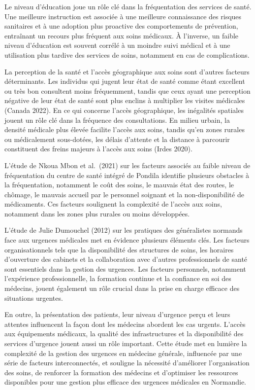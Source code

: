 \documentclass[
]{article}
\begin{document}
Le niveau d'éducation joue un rôle clé dans la fréquentation des
services de santé. Une meilleure instruction est associée à une
meilleure connaissance des risques sanitaires et à une adoption plus
proactive des comportements de prévention, entraînant un recours plus
fréquent aux soins médicaux. À l'inverse, un faible niveau d'éducation
est souvent corrélé à un moindre suivi médical et à une utilisation plus
tardive des services de soins, notamment en cas de complications.

La perception de la santé et l'accès géographique aux soins sont
d'autres facteurs déterminants. Les individus qui jugent leur état de
santé comme étant excellent ou très bon consultent moins fréquemment,
tandis que ceux ayant une perception négative de leur état de santé sont
plus enclins à multiplier les visites médicales (Canada 2022). En ce qui
concerne l'accès géographique, les inégalités spatiales jouent un rôle
clé dans la fréquence des consultations. En milieu urbain, la densité
médicale plus élevée facilite l'accès aux soins, tandis qu'en zones
rurales ou médicalement sous-dotées, les délais d'attente et la distance
à parcourir constituent des freins majeurs à l'accès aux soins (Irdes
2020).

L'étude de Nkoua Mbon et al.~(2021) sur les facteurs associés au faible
niveau de fréquentation du centre de santé intégré de Pondila identifie
plusieurs obstacles à la fréquentation, notamment le coût des soins, le
mauvais état des routes, le chômage, le mauvais accueil par le personnel
soignant et la non-disponibilité de médicaments. Ces facteurs soulignent
la complexité de l'accès aux soins, notamment dans les zones plus
rurales ou moins développées.

L'étude de Julie Dumouchel (2012) sur les pratiques des généralistes
normands face aux urgences médicales met en évidence plusieurs éléments
clés. Les facteurs organisationnels tels que la disponibilité des
structures de soins, les horaires d'ouverture des cabinets et la
collaboration avec d'autres professionnels de santé sont essentiels dans
la gestion des urgences. Les facteurs personnels, notamment l'expérience
professionnelle, la formation continue et la confiance en soi des
médecins, jouent également un rôle crucial dans la prise en charge
efficace des situations urgentes.

En outre, la présentation des patients, leur niveau d'urgence perçu et
leurs attentes influencent la façon dont les médecins abordent les cas
urgents. L'accès aux équipements médicaux, la qualité des
infrastructures et la disponibilité des services d'urgence jouent aussi
un rôle important. Cette étude met en lumière la complexité de la
gestion des urgences en médecine générale, influencée par une série de
facteurs interconnectés, et souligne la nécessité d'améliorer
l'organisation des soins, de renforcer la formation des médecins et
d'optimiser les ressources disponibles pour une gestion plus efficace
des urgences médicales en Normandie.
\end{document}
